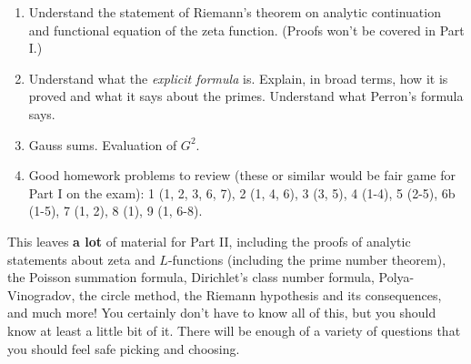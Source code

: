 \documentclass[12pt]{article}
\begin{document}
\begin{enumerate}
\item
Understand the statement of Riemann's theorem on analytic continuation and functional equation of the zeta
function. (Proofs won't be covered in Part I.)

\item
Understand what the {\itshape explicit formula} is. Explain, in broad terms, how it is proved and what it says
about the primes. Understand what Perron's formula says.

\item
Gauss sums. Evaluation of $G^2$. 

\item
Good homework problems to review (these or similar would be fair game for Part I on the exam): 
1 (1, 2, 3, 6, 7), 2 (1, 4, 6), 3 (3, 5), 4 (1-4), 5 (2-5), 6b (1-5), 7 (1, 2), 8 (1), 9 (1, 6-8).
 
\end{enumerate}
This leaves {\bf a lot} of material for Part II, including the proofs of analytic statements about zeta and
$L$-functions (including the prime number theorem), the Poisson summation formula, Dirichlet's class number formula,
Polya-Vinogradov, the circle method, the Riemann hypothesis and its consequences, and much more! You certainly
don't have to know all of this, but you should know at least a little bit of it. There will be enough of a variety
of questions that you should feel safe picking and choosing.
\end{document}
